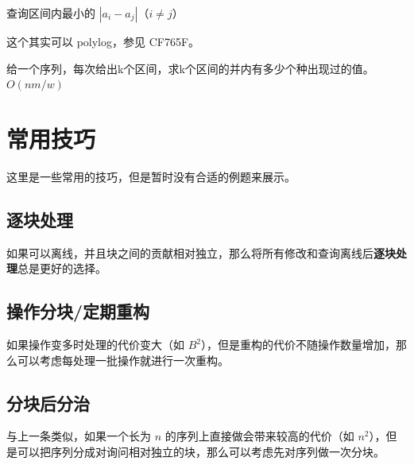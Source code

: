 \begin{example}[查询区间最小差]
    查询区间内最小的 $|a_i-a_j|$（$i\ne j$）
\end{example}
\begin{remark}
    这个其实可以 polylog，参见 CF765F。
\end{remark}

\begin{example}[k 区间颜色数]
    给一个序列，每次给出k个区间，求k个区间的并内有多少个种出现过的值。$O(nm/w)$
\end{example}

\section{常用技巧}

这里是一些常用的技巧，但是暂时没有合适的例题来展示。

\subsection{逐块处理}

如果可以离线，并且块之间的贡献相对独立，那么将所有修改和查询离线后\textbf{逐块处理}总是更好的选择。

\subsection{操作分块/定期重构}

如果操作变多时处理的代价变大（如 $B^2$），但是重构的代价不随操作数量增加，那么可以考虑每处理一批操作就进行一次重构。

\subsection{分块后分治}

与上一条类似，如果一个长为 $n$ 的序列上直接做会带来较高的代价（如 $n^2$），但是可以把序列分成对询问相对独立的块，那么可以考虑先对序列做一次分块。

\begin{example}[P5611]
\end{example}